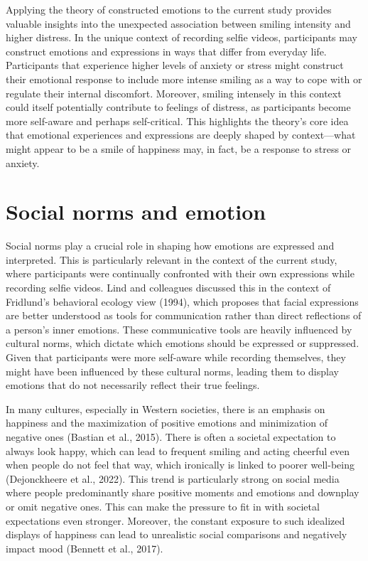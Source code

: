 \documentclass[authordate, reflection,issue]{jote-new-article}
\begin{document}
	Applying the theory of constructed emotions to the current study provides valuable insights into the unexpected association between smiling intensity and higher distress. In the unique context of recording selfie videos, participants may construct emotions and expressions in ways that differ from everyday life. Participants that experience higher levels of anxiety or stress might construct their emotional response to include more intense smiling as a way to cope with or regulate their internal discomfort. Moreover, smiling intensely in this context could itself potentially contribute to feelings of distress, as participants become more self-aware and perhaps self-critical. This highlights the theory's core idea that emotional experiences and expressions are deeply shaped by context—what might appear to be a smile of happiness may, in fact, be a response to stress or anxiety.







	\section{Social norms and emotion}



	Social norms play a crucial role in shaping how emotions are expressed and interpreted. This is particularly relevant in the context of the current study, where participants were continually confronted with their own expressions while recording selfie videos. Lind and colleagues discussed this in the context of Fridlund's behavioral ecology view (1994), which proposes that facial expressions are better understood as tools for communication rather than direct reflections of a person's inner emotions. These communicative tools are heavily influenced by cultural norms, which dictate which emotions should be expressed or suppressed. Given that participants were more self-aware while recording themselves, they might have been influenced by these cultural norms, leading them to display emotions that do not necessarily reflect their true feelings.



	In many cultures, especially in Western societies, there is an emphasis on happiness and the maximization of positive emotions and minimization of negative ones (Bastian et al., 2015). There is often a societal expectation to always look happy, which can lead to frequent smiling and acting cheerful even when people do not feel that way, which ironically is linked to poorer well-being (Dejonckheere et al., 2022). This trend is particularly strong on social media where people predominantly share positive moments and emotions and downplay or omit negative ones. This can make the pressure to fit in with societal expectations even stronger. Moreover, the constant exposure to such idealized displays of happiness can lead to unrealistic social comparisons and negatively impact mood (Bennett et al., 2017).
\end{document}
